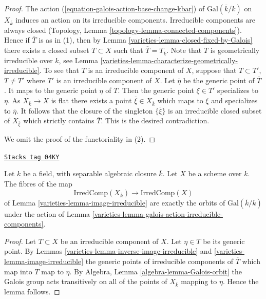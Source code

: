 \begin{proof}

The action (\ref{equation-galois-action-base-change-kbar})
of $\text{Gal}(\overline{k}/k)$ on $X_{\overline{k}}$
induces an action on its irreducible components.
Irreducible components are always closed
(Topology, Lemma \ref{topology-lemma-connected-components}).
Hence if $\overline{T}$ is as in (1), then by
Lemma \ref{varieties-lemma-closed-fixed-by-Galois} there exists a closed
subset $T \subset X$ such that $\overline{T} = T_{\overline{k}}$.
Note that $T$ is geometrically irreducible over $k$, see
Lemma \ref{varieties-lemma-characterize-geometrically-irreducible}.
To see that $T$ is an irreducible component of $X$, suppose that
$T \subset T'$, $T \not = T'$ where $T'$ is an irreducible
component of $X$. Let $\overline{\eta}$ be the generic point of
$\overline{T}$. It maps to the generic point $\eta$ of $T$.
Then the generic point $\xi \in T'$ specializes to $\eta$.
As $X_{\overline{k}} \to X$ is flat there exists a point
$\overline{\xi} \in X_{\overline{k}}$ which maps to $\xi$ and
specializes to $\overline{\eta}$. It follows that
the closure of the singleton $\{\overline{\xi}\}$ is an
irreducible closed subset of $X_{\overline{\xi}}$ which
strictly contains $\overline{T}$. This is the desired contradiction.

\medskip\noindent
We omit the proof of the functoriality in (2).
\end{proof}

\begin{lemma}
\label{varieties-lemma-orbit-irreducible-components}
\href{https://stacks.math.columbia.edu/tag/04KY}{\texttt{Stacks tag 04KY}}

Let $k$ be a field, with separable algebraic closure $\overline{k}$.
Let $X$ be a scheme over $k$.
The fibres of the map
$$
\text{IrredComp}(X_{\overline{k}})
\longrightarrow
\text{IrredComp}(X)
$$
of
Lemma \ref{varieties-lemma-image-irreducible}
are exactly the orbits of $\text{Gal}(\overline{k}/k)$ under the action of
Lemma \ref{varieties-lemma-galois-action-irreducible-components}.
\end{lemma}

\begin{proof}

Let $T \subset X$ be an irreducible component of $X$.
Let $\eta \in T$ be its generic point. By
Lemmas \ref{varieties-lemma-inverse-image-irreducible} and
\ref{varieties-lemma-image-irreducible}
the generic points of irreducible components of $\overline{T}$
which map into $T$ map to $\eta$. By
Algebra, Lemma \ref{algebra-lemma-Galois-orbit}
the Galois group acts transitively on
all of the points of $X_{\overline{k}}$ mapping to $\eta$.
Hence the lemma follows.
\end{proof}

